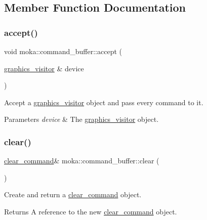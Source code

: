 \subsection{Member Function Documentation}
\mbox{\label{classmoka_1_1command__buffer_a9765709e0b8ba774d9f01bee0f99da29}} 
\subsubsection{\texorpdfstring{accept()}{accept()}}
{\footnotesize\ttfamily void moka\+::command\+\_\+buffer\+::accept (\begin{DoxyParamCaption}\item[{\mbox{\hyperlink{classmoka_1_1graphics__visitor}{graphics\+\_\+visitor}} \&}]{device }\end{DoxyParamCaption})}



Accept a \mbox{\hyperlink{classmoka_1_1graphics__visitor}{graphics\+\_\+visitor}} object and pass every command to it. 


\begin{DoxyParams}{Parameters}
{\em device} & The \mbox{\hyperlink{classmoka_1_1graphics__visitor}{graphics\+\_\+visitor}} object. \\
\hline
\end{DoxyParams}
\mbox{\label{classmoka_1_1command__buffer_ad205979eec979fef0635c8f34ac53251}} 
\subsubsection{\texorpdfstring{clear()}{clear()}}
{\footnotesize\ttfamily \mbox{\hyperlink{classmoka_1_1clear__command}{clear\+\_\+command}}\& moka\+::command\+\_\+buffer\+::clear (\begin{DoxyParamCaption}{ }\end{DoxyParamCaption})}



Create and return a \mbox{\hyperlink{classmoka_1_1clear__command}{clear\+\_\+command}} object. 

\begin{DoxyReturn}{Returns}
A reference to the new \mbox{\hyperlink{classmoka_1_1clear__command}{clear\+\_\+command}} object. 
\end{DoxyReturn}
\mbox{\label{classmoka_1_1command__buffer_a7015f06818636a80e846c0ce3bf4eea2}} 
